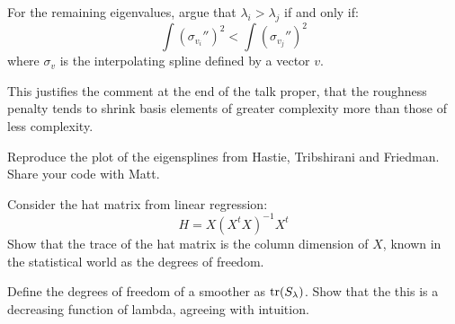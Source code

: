 %
%
\begin{frame}
  For the remaining eigenvalues, argue that $\lambda_i > \lambda_j$ if and only if:
  $$ \int (\sigma_{v_i}'')^2 < \int (\sigma_{v_j}'')^2 $$
where $\sigma_v$ is the interpolating spline defined by a vector $v$.

  This justifies the comment at the end of the talk proper, that the roughness penalty tends to shrink basis elements of greater complexity more than those of less complexity.
\end{frame}
%
%
\begin{frame}
  Reproduce the plot of the eigensplines from Hastie, Tribshirani and Friedman.  Share your code with Matt.
\end{frame}
%
%
\begin{frame}
  Consider the hat matrix from linear regression:
  $$ H = X (X^t X)^{-1} X^t $$
  Show that the trace of the hat matrix is the column dimension of $X$, known in the statistical world as the degrees of freedom.
\end{frame}
%
%
\begin{frame}
  Define the degrees of freedom of a smoother as $ \operatorname*{tr}( S_{\lambda} )$.  Show that the this is a decreasing function of lambda, agreeing with intuition.
\end{frame}
